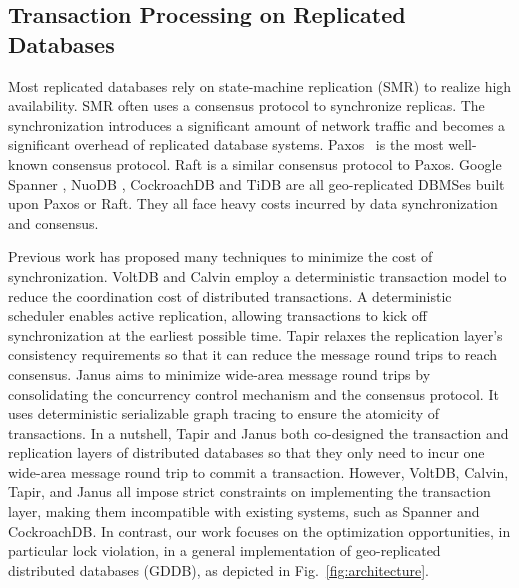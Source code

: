 \documentclass[conference]{IEEEtran}
\begin{document}
\subsection{Transaction Processing on Replicated Databases}


Most replicated databases rely on state-machine replication (SMR) to realize high availability.
SMR often uses a consensus protocol to synchronize replicas.
The synchronization introduces a significant amount of network traffic and becomes a significant overhead of replicated database systems.
Paxos~\cite{Paxos:journals/tocs/Lamport98} is the most well-known consensus protocol.
Raft\cite{Raft:conf/usenix/OngaroO14} is a similar consensus protocol to Paxos.
Google Spanner \cite{Spanner:conf/osdi/CorbettDEFFFGGHHHKKLLMMNQRRSSTWW12},
NuoDB \cite{NuoDB}, CockroachDB \cite{CockroachDB} and TiDB \cite{TiDB} are all geo-replicated DBMSes built upon Paxos or Raft.
They all face heavy costs incurred by data synchronization and consensus.

Previous work has proposed many techniques
to minimize the cost of synchronization.
VoltDB \cite{VoltDB} and Calvin \cite{Calvin:conf/sigmod/ThomsonDWRSA12} employ a deterministic transaction model
to reduce the coordination cost of distributed transactions.
A deterministic scheduler enables active replication, allowing transactions to kick off synchronization at the earliest possible time.
Tapir \cite{Tapir:conf/sosp/ZhangSSKP15} relaxes the replication layer's consistency requirements so that it can reduce the message round trips to reach consensus.
Janus \cite{Janus:conf/osdi/MuNLL16} aims to minimize wide-area message round trips
by consolidating the concurrency control mechanism and the consensus protocol.
It uses deterministic serializable graph tracing to ensure the atomicity of transactions.
In a nutshell, Tapir and Janus both co-designed the transaction and replication layers of distributed databases so that they only need to incur one wide-area message round trip to commit a transaction.
However, VoltDB, Calvin, Tapir, and Janus all impose strict constraints on implementing the transaction layer, making them incompatible with existing systems, such as Spanner and CockroachDB.
In contrast, our work focuses on the optimization opportunities, in particular lock violation, in a general implementation of geo-replicated distributed databases (GDDB), as depicted in Fig.~\ref{fig:architecture}.
\end{document}
